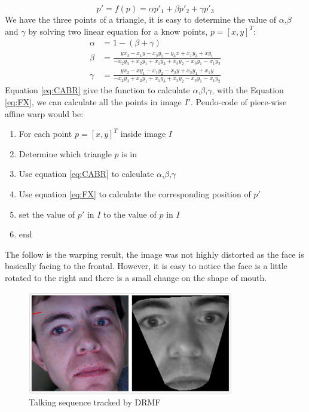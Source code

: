 \begin{equation}
p' = f(p) = \alpha p'_{1} + \beta p'_{2} + \gamma p'_{3}
\label{eq:FX}
\end{equation}
We have the three points of a triangle, it is easy to determine the value of $\alpha$,$\beta$ and $\gamma$ by solving two linear equation for a know points, $p = [x,y]^{T}$:
\begin{equation}
\label{eq:CABR}
\begin{split}
\alpha & = 1 - (\beta + \gamma) \\
\beta  & = \frac{yx_{3}-x_{1}y-x_{3}y_{1}-y_{3}x+x_{1}y_{3}+xy_{1}}{-x_{2}y_{3}+x_{2}y_{1}+x_{1}y_{3}+x_{3}y_{2}-x_{3}y_{1}-x_{1}y_{2}} \\
\gamma & = \frac{yx_{2}-xy_{1}-x_{1}y_{2}-x_{2}y+x_{2}y_{1}+x_{1}y}{-x_{2}y_{3}+x_{2}y_{1}+x_{1}y_{3}+x_{3}y_{2}-x_{3}y_{1}-x_{1}y_{2}}
\end{split}
\end{equation}
\newline
Equation \ref{eq:CABR} give the function to calculate $\alpha$,$\beta$,$\gamma$, with the Equation \ref{eq:FX}, we can calculate all the points in image $I'$. Peudo-code of piece-wise affine warp would be:
\begin{enumerate}
\item For each point $p = [x,y]^{T}$ inside image $I$
\item Determine which triangle $p$ is in
\item Use equation \ref{eq:CABR} to calculate $\alpha$,$\beta$,$\gamma$
\item Use equation \ref{eq:FX} to calculate the corresponding position of $p'$
\item set the value of $p'$ in $I$ to the value of $p$ in $I$
\item end
\end{enumerate}
The follow is the warping result, the image was not highly distorted as the face is basically facing to the frontal. However, it is easy to notice the face is a little rotated to the right and there is a small change on the shape of mouth.
\begin{figure}[ht]
\centering
\includegraphics[width=90mm]{imgs/Warping_Intraface_213.png}
\caption{Talking sequence tracked by DRMF}
\end{figure}
\newpage
